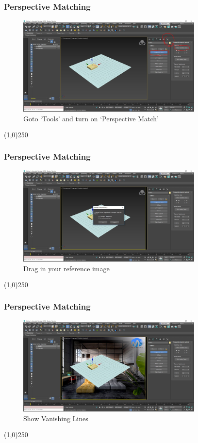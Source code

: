 \begin{frame}
	\frametitle{Perspective Matching}
	\begin{figure}
		\centering
		\includegraphics[height=5cm]{./img/PerspectiveMatching/2.jpg}
		\caption[Goto `Tools' and turn on `Perspective Match']{Goto `Tools' and turn on `Perspective Match'}
		\label{fig:PerspectiveMatch2}
	\end{figure}
\end{frame}
\begin{center}\line(1,0){250}\end{center}



\begin{frame}
	\frametitle{Perspective Matching}
	\begin{figure}
		\centering
		\includegraphics[height=5cm]{./img/PerspectiveMatching/3.jpg}
		\caption[Drag in your reference image]{Drag in your reference image}
		\label{fig:PerspectiveMatch3}
	\end{figure}
\end{frame}
\begin{center}\line(1,0){250}\end{center}


\begin{frame}
	\frametitle{Perspective Matching}
	\begin{figure}
		\centering
		\includegraphics[height=5cm]{./img/PerspectiveMatching/4.jpg}
		\caption[Show Vanishing Lines]{Show Vanishing Lines}
		\label{fig:PerspectiveMatch4}
	\end{figure}
\end{frame}
\begin{center}\line(1,0){250}\end{center}



